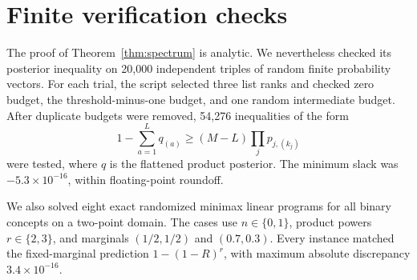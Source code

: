 \documentclass{article}
\theoremstyle{definition}
\theoremstyle{remark}
\newcommand{\1}{\mathbf 1}
\begin{document}
\section{Finite verification checks}
\label{app:verification}

The proof of Theorem~\ref{thm:spectrum} is analytic. We nevertheless checked its posterior inequality on 20,000 independent triples of random finite probability vectors. For each trial, the script selected three list ranks and checked zero budget, the threshold-minus-one budget, and one random intermediate budget. After duplicate budgets were removed, 54,276 inequalities of the form \[ 1-\sum_{a=1}^Lq_{(a)} \ge(M-L)\prod_jp_{j,(k_j)} \] were tested, where \(q\) is the flattened product posterior. The minimum slack was \(-5.3\times10^{-16}\), within floating-point roundoff.

We also solved eight exact randomized minimax linear programs for all binary concepts on a two-point domain. The cases use \(n\in\{0,1\}\), product powers \(r\in\{2,3\}\), and marginals \((1/2,1/2)\) and \((0.7,0.3)\). Every instance matched the fixed-marginal prediction \(1-(1-R)^r\), with maximum absolute discrepancy \(3.4\times10^{-16}\).
\end{document}
